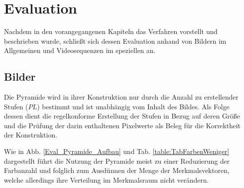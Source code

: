 \chapter{Evaluation}
  Nachdem in den vorangegangenen Kapiteln das Verfahren vorstellt und beschrieben wurde, schließt sich dessen Evaluation anhand von Bildern im Allgemeinen und Videosequenzen im speziellen an.\\

\section{Bilder}

  Die Pyramide wird in ihrer Konstruktion nur durch die Anzahl zu erstellender Stufen ($PL$) bestimmt und ist unabhängig vom Inhalt des Bildes. 
  Als Folge dessen dient die regelkonforme Erstellung der Stufen in Bezug auf deren Größe und die Prüfung der darin enthaltenen Pixelwerte als Beleg für die Korrektheit der Konstruktion.

  Wie in Abb. \ref{Eval_Pyramide_Aufbau} und Tab. \ref{table:TabFarbenWeniger} dargestellt führt die Nutzung der Pyramide meist zu einer Reduzierung der Farbanzahl und folglich zum Ausdünnen der Menge der Merkmalsvektoren, welche allerdings ihre Verteilung im Merkmalsraum nicht verändern.

